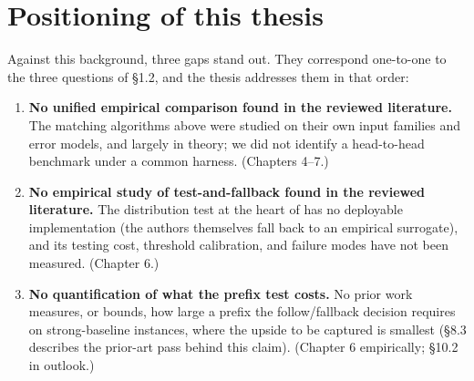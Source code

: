 \section{Positioning of this thesis}

Against this background, three gaps stand out. They correspond
one-to-one to the three questions of §1.2, and the thesis addresses them
in that order:

\begin{enumerate}
\def\labelenumi{\arabic{enumi}.}
\tightlist
\item
  \textbf{No unified empirical comparison found in the reviewed
  literature.} The matching algorithms above were studied on their own
  input families and error models, and largely in theory; we did not
  identify a head-to-head benchmark under a common harness. (Chapters
  4--7.)
\item
  \textbf{No empirical study of test-and-fallback found in the reviewed
  literature.} The distribution test at the heart of
  \autocite{choo2024imperfect,bem2026testmatch} has no deployable
  implementation (the authors themselves fall back to an empirical
  surrogate), and its testing cost, threshold calibration, and failure
  modes have not been measured. (Chapter 6.)
\item
  \textbf{No quantification of what the prefix test costs.} No prior
  work measures, or bounds, how large a prefix the follow/fallback
  decision requires on strong-baseline instances, where the upside to be
  captured is smallest (§8.3 describes the prior-art pass behind this
  claim). (Chapter 6 empirically; §10.2 in outlook.)
\end{enumerate}
